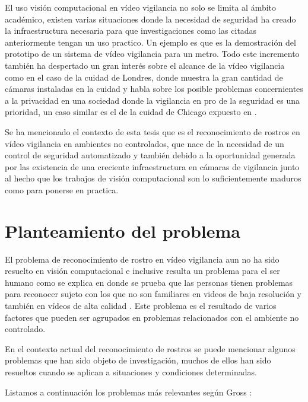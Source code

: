 El uso visión computacional en vídeo vigilancia no solo se limita al ámbito académico, existen varias situaciones donde la necesidad de seguridad ha creado la infraestructura necesaria para que investigaciones como las citadas anteriormente tengan un uso practico. Un ejemplo es \cite{odobez2012unsupervised} que es la demostración del prototipo de un sistema de vídeo vigilancia para un metro. Todo este incremento también ha despertado un gran interés sobre el alcance de la vídeo vigilancia como en el caso de la cuidad de Londres, donde \cite{wood2006report} muestra la gran cantidad de cámaras instaladas en la cuidad y habla sobre los posible problemas concernientes a la privacidad en una sociedad donde la vigilancia en pro de la seguridad es una prioridad, un caso similar es el de la cuidad de Chicago expuesto en \cite{schwartz2012chicago}.

Se ha mencionado el contexto de esta tesis que es el reconocimiento de rostros en vídeo vigilancia en ambientes no controlados, que nace de la necesidad de un control de seguridad automatizado y también debido a la oportunidad generada por las existencia de una creciente infraestructura en cámaras de vigilancia junto al hecho que los trabajos de visión computacional son lo suficientemente maduros como para ponerse en practica.


\section{Planteamiento del problema}\label{ssc:PlanteamientoProblema}
El problema de reconocimiento de rostro en vídeo vigilancia aun no ha sido resuelto en visión computacional e inclusive resulta un problema para el ser humano como se explica en \cite{burton1999face} donde se prueba que las personas tienen problemas para reconocer sujeto con los que no son familiares en videos de baja resolución y también en vídeos de alta calidad \cite{burton1999face}.
Este problema es el resultado de varios factores que pueden ser agrupados en problemas relacionados con el ambiente no controlado.

En el contexto actual del reconocimiento de rostros se puede mencionar algunos problemas que han sido objeto de investigación, muchos de ellos han sido resueltos cuando se aplican a situaciones y condiciones determinadas. 

Listamos a continuación  los problemas más relevantes según Gross  \cite{gross2001quo}:

